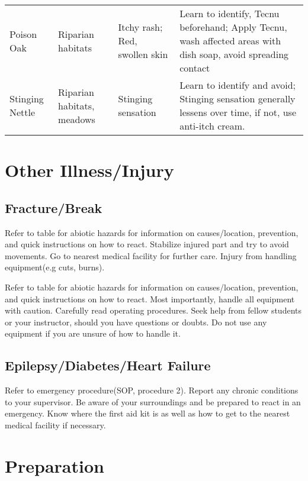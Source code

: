 \documentclass[12pt]{../SOP4_alpha}\usepackage[]{graphicx}\usepackage[]{color}
\begin{document}
\begin{table}
\begin{tabular}{p{.8in}p{1in}p{1.5in}p{2.5in}}
Poison Oak
          & Riparian habitats
          & Itchy rash; Red, swollen skin
          & \footnotesize{Learn to identify, Tecnu beforehand; Apply Tecnu, wash affected areas with dish soap, avoid spreading contact}\\

Stinging Nettle
          & Riparian habitats, meadows
          & Stinging sensation
          & \footnotesize{Learn to identify and avoid; Stinging sensation generally lessens over time, if not, use anti-itch cream.} \\

\hline
\end{tabular}
\end{table}





\section{Other Illness/Injury}

\subsection{Fracture/Break}

\NP Refer to table for abiotic hazards for information on causes/location, prevention, and quick instructions on how to react. Stabilize injured part and try to avoid movements. Go to nearest medical facility for further care.
Injury from handling equipment(e.g cuts, burns).


\NP Refer to table for abiotic hazards for information on causes/location, prevention, and quick instructions on how to react. Most importantly, handle all equipment with caution. Carefully read operating procedures. Seek help from fellow students or your instructor, should you have questions or doubts. Do not use any equipment if you are unsure of how to handle it. 

\subsection{Epilepsy/Diabetes/Heart Failure}

Refer to emergency procedure(SOP, procedure 2).
Report any chronic conditions to your supervisor.
Be aware of your surroundings and be prepared to react in an emergency.
Know where the first aid kit is as well as how to get to the nearest medical facility if necessary. 


\section{Preparation}
\end{document}
